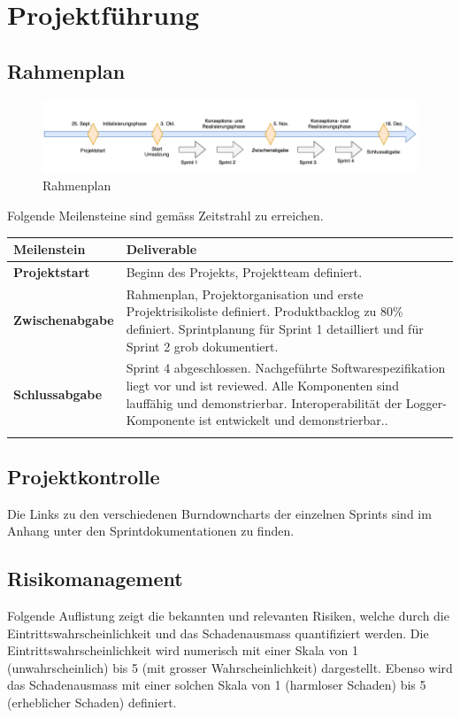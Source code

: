 \section{Projektführung}
\subsection{Rahmenplan}
\begin{figure}[H]
	\centering
	\includegraphics[width=\linewidth]{2_Projektfuehrung/Bilder/rahmenplan.png}
	\caption{Rahmenplan}
	\label{fig: Rahmenplan}
\end{figure}
Folgende Meilensteine sind gemäss Zeitstrahl zu erreichen.
\begin{center}
	\begin{tabularx}{\textwidth}{|X|X|}
		\hline
		\textbf{Meilenstein} & \textbf{Deliverable} \\
		\hline
		\textbf{Projektstart} & Beginn des Projekts, Projektteam definiert. \\
		\hline
		\textbf{Zwischenabgabe} & Rahmenplan, Projektorganisation und erste Projektrisikoliste definiert. Produktbacklog zu 80\% definiert. Sprintplanung für Sprint 1 detailliert und für Sprint 2 grob dokumentiert. \\
		\hline
		\textbf{Schlussabgabe} & Sprint 4 abgeschlossen. Nachgeführte Softwarespezifikation liegt vor und ist reviewed. Alle Komponenten sind lauffähig und demonstrierbar. Interoperabilität der Logger-Komponente ist entwickelt und demonstrierbar.. \\
		\hline
		\caption{Meilensteine}\label{meilensteine}\\
	\end{tabularx}
\end{center}
\subsection{Projektkontrolle}
Die Links zu den verschiedenen Burndowncharts der einzelnen Sprints sind im Anhang unter den Sprintdokumentationen zu finden.
\newpage
\subsection{Risikomanagement}
Folgende Auflistung zeigt die bekannten und relevanten Risiken, welche durch die Eintrittswahrscheinlichkeit und das Schadenausmass quantifiziert werden. Die Eintrittswahrscheinlichkeit wird numerisch mit einer Skala von 1 (unwahrscheinlich) bis 5 (mit grosser Wahrscheinlichkeit) dargestellt. Ebenso wird das Schadenausmass mit einer solchen Skala von 1 (harmloser Schaden) bis 5 (erheblicher Schaden) definiert.

